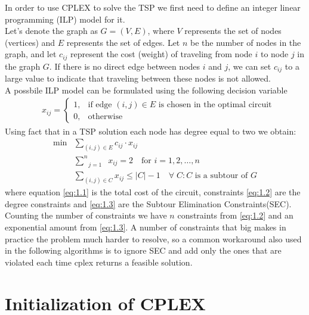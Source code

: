 In order to use CPLEX to solve the TSP we first need to define an integer linear programming (ILP) model for it. \\
Let's denote the graph as $G=(V,E)$, where $V$ represents the set of nodes (vertices) and $E$ represents the set of edges.
Let $n$ be the number of nodes in the graph, and let $c_{ij}$ represent the cost (weight) of traveling from node $i$ to node $j$ in the graph $G$. If there is no direct edge between nodes $i$ and $j$, we can set $c_{ij}$ to a large value to indicate that traveling between these nodes is not allowed. \\
A possbile ILP model can be formulated using the following decision variable
\begin{align*}
	& x_{ij} = 
	\begin{cases}
		1, & \text{if edge } (i,j)\in E \text{ is chosen in the optimal circuit}\\
		0, & \text{otherwise}
	\end{cases}
\end{align*}
Using fact that in a TSP solution each node has degree equal to two we obtain:
\begin{align}
	\text{min} &\sum\limits_{(i,j)\in E} c_{ij} \cdot x_{ij} \tag{1.1}\label{eq:1.1} \\
	&\sum\limits_{\:\;\;j=1\:\;\;}^{n} x_{ij} = 2 \quad \text{for } i = 1,2,\ldots,n \tag{1.2}\label{eq:1.2} \\
	&\sum\limits_{(i,j)\in C} x_{ij} \leq |C| - 1 \quad \forall \; C: C \text{ is a subtour of } G \tag{1.3}\label{eq:1.3}
\end{align}
where equation \eqref{eq:1.1} is the total cost of the circuit, constraints \eqref{eq:1.2} are the degree constraints and \eqref{eq:1.3} are the Subtour Elimination Constraints(SEC). Counting the number of constraints we have $n$ constraints from \eqref{eq:1.2} and an exponential amount from \eqref{eq:1.3}. A number of constraints that big makes in practice the problem much harder to resolve, so a common workaround also used in the following algorithms is to ignore SEC and add only the ones that are violated each time cplex returns a feasible solution.

\section{Initialization of CPLEX}

